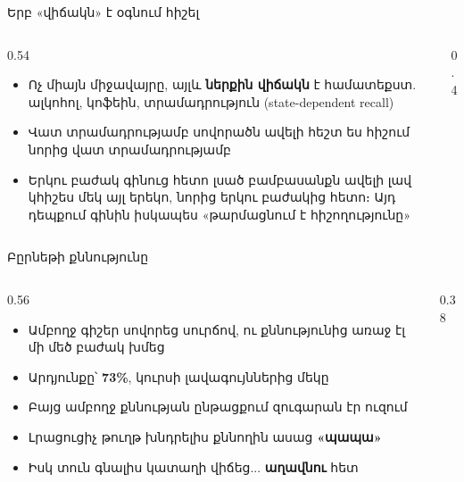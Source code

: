 \begin{frame}{Երբ «վիճակն» է օգնում հիշել}
  \begin{columns}[T]
    \begin{column}{0.54\textwidth}
      \begin{itemize}
        \item Ոչ միայն միջավայրը, այլև \textbf{ներքին վիճակն} է համատեքստ. ալկոհոլ, կոֆեին, տրամադրություն (state-dependent recall)
        \item<2-> Վատ տրամադրությամբ սովորածն ավելի հեշտ ես հիշում նորից վատ տրամադրությամբ
        \item<3-> Երկու բաժակ գինուց հետո լսած բամբասանքն ավելի լավ կհիշես մեկ այլ երեկո, նորից երկու բաժակից հետո։ Այդ դեպքում գինին իսկապես «թարմացնում է հիշողությունը»
      \end{itemize}
    \end{column}
    \begin{column}{0.4\textwidth}
    \end{column}
  \end{columns}
\end{frame}

\begin{frame}{Բըրնեթի քննությունը}
  \begin{columns}[c]
    \begin{column}{0.56\textwidth}
      \begin{itemize}
        \item Ամբողջ գիշեր սովորեց սուրճով, ու քննությունից առաջ էլ մի մեծ բաժակ խմեց 
        \item<2-> Արդյունքը՝ \textbf{73\%}, կուրսի լավագույններից մեկը
        \item<3-> Բայց ամբողջ քննության ընթացքում զուգարան էր ուզում
        \item<4-> Լրացուցիչ թուղթ խնդրելիս քննողին ասաց \textbf{«պապա»}
        \item<5-> Իսկ տուն գնալիս կատաղի վիճեց... \textbf{աղավնու} հետ 
      \end{itemize}
    \end{column}
    \begin{column}{0.38\textwidth}
      \centering
      \par\medskip
    \end{column}
  \end{columns}
\end{frame}


